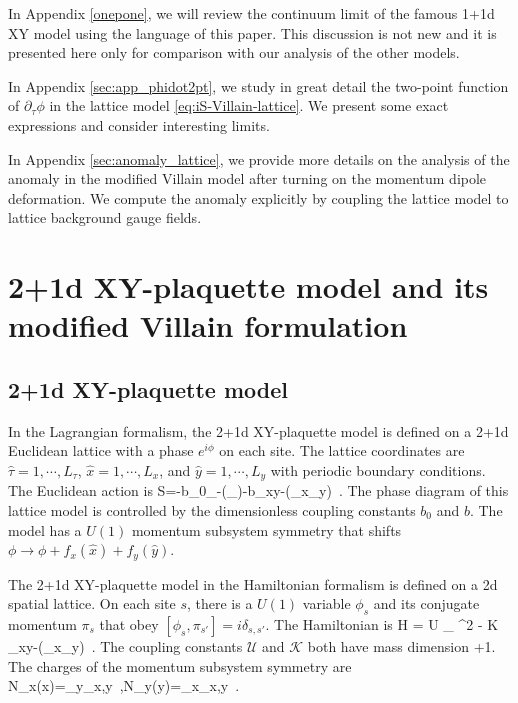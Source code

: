 \documentclass[12pt]{article}
\numberwithin{equation}{section}
\begin{document}
In Appendix \ref{onepone}, we will review the continuum limit of the famous 1+1d XY model using the language of this paper.  This discussion is not new and it is presented here only for comparison with our analysis of the other models.

In Appendix \ref{sec:app_phidot2pt}, we study in great detail the two-point function of $\partial_\tau \phi$ in the lattice model \eqref{eq:iS-Villain-lattice}.   We present some exact expressions and consider interesting limits.

In Appendix \ref{sec:anomaly_lattice}, we provide more details on the analysis of the anomaly in the modified Villain model after turning on the momentum dipole deformation. We compute the anomaly explicitly by coupling the lattice model to lattice background gauge fields.



\section{2+1d XY-plaquette model and its modified Villain formulation}\label{sec:2+1d-XYplaq}

\subsection{2+1d XY-plaquette model}
In the Lagrangian formalism, the 2+1d XY-plaquette model \cite{PhysRevB.66.054526} is defined on a 2+1d Euclidean lattice with a phase $e^{i\phi}$ on each site.
 The   lattice coordinates are $\hat \tau =1,\cdots, L_\tau$, $\hat x=1,\cdots, L_x$, and $\hat y=1,\cdots, L_y$ with periodic boundary conditions.
 The Euclidean action is
\ie\label{eq:S_XY_plaq}
S=-b_0\sum_{\tau-}\cos(\Delta_\tau \phi)-b\sum_{xy-}\cos(\Delta_x\Delta_y\phi)~.
\fe
The phase diagram of this lattice model is controlled by the dimensionless coupling constants $b_0$ and $b$. The model has a $U(1)$ momentum subsystem symmetry that shifts $\phi\rightarrow\phi+f_x(\hat x)+f_y(\hat y)$.


The 2+1d XY-plaquette model in the Hamiltonian formalism is defined on a 2d spatial lattice. On each site $s$, there is a $U(1)$ variable $\phi_s$ and its conjugate momentum $\pi_s$ that obey $[\phi_s,\pi_{s'}]=i\delta_{s,s'}$. The Hamiltonian is
\ie\label{eq:H_XY_plaq}
H  = { \mathcal U } \sum_{} \pi^2 - {\mathcal K }\sum_{xy-}\cos(\Delta_x\Delta_y\phi)~.
\fe
The coupling constants $\mathcal U$ and $\mathcal K$ both have mass dimension +1.
The charges of the momentum subsystem symmetry  are
\ie\label{eq:momentum_charge}
N_x(\hat x)=\sum_{\hat y}\pi_{\hat x,\hat y}~,\quad  N_y(\hat y)=\sum_{\hat x}\pi_{\hat x,\hat y}~.
\fe
\end{document}
